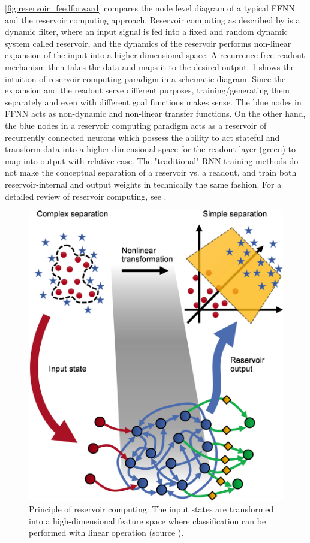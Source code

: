 \figurename \ref{fig:reservoir_feedforward} compares the node level diagram of a typical FFNN and the reservoir computing approach. Reservoir computing as described by \citet{schrauwen2007overview} is a dynamic filter, where an input signal is fed into a fixed and random dynamic system called reservoir, and the dynamics of the reservoir performs non-linear expansion of the input into a higher dimensional space. A recurrence-free readout mechanism then takes the data and maps it to the desired output. \figurename \ref{fig:reservoir_intuition} shows the intuition of reservoir computing paradigm in a schematic diagram. Since the expansion and the readout serve different purposes, training/generating them separately and even with different goal functions makes sense. The blue nodes in FFNN acts as non-dynamic and non-linear transfer functions. 	On the other hand, the blue nodes in a reservoir computing paradigm acts as a reservoir of recurrently connected neurons which possess the ability to act stateful and transform data into a higher dimensional space for the readout layer (green) to map into output with relative ease. The "traditional" RNN training methods do not make the conceptual separation of a reservoir vs. a readout, and train both reservoir-internal and output weights in technically the same fashion. For a detailed review of reservoir computing, see \citep{lukovsevivcius2009reservoir}.
\begin{figure}
	\centering
	\includegraphics[scale=0.1]{fig/neucube/reservoir_intuition.png}
	\caption{Principle of reservoir computing: The input states are transformed into a high-dimensional feature space where classification can be performed with linear operation (source \citet{ibm2018stefan}).}
	\label{fig:reservoir_intuition}
\end{figure}

